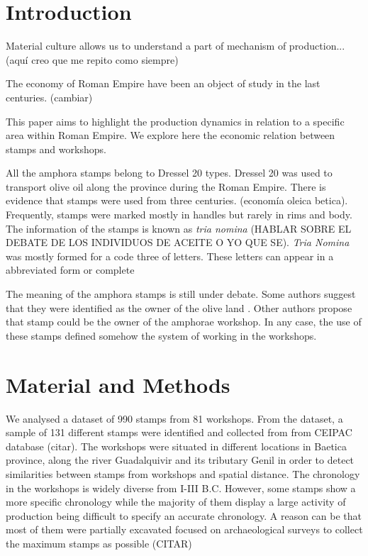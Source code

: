 \documentclass[review]{elsarticle}
\begin{document}
\section{Introduction}


Material culture allows us to understand a part of mechanism of production... (aquí creo que me repito como siempre)


The economy of Roman Empire have been an object of study in the last centuries. (cambiar)

This paper aims to highlight the production dynamics in relation to a specific area within Roman Empire. We explore here the economic relation between stamps and workshops. 





All the amphora stamps belong to Dressel 20 types. Dressel 20 was used to transport olive oil along the province during the Roman Empire. There is evidence that stamps were used from three centuries. (economía oleica betica). Frequently, stamps were marked mostly in handles but rarely in rims and body.  
The information of the stamps is known as \textit{tria nomina} (HABLAR SOBRE EL DEBATE DE LOS INDIVIDUOS DE ACEITE O YO QUE SE). \textit{Tria Nomina} was mostly formed for a code three of letters. These letters can appear in a abbreviated form or complete \citep{berni_millet_amphora_1996}

The meaning of the amphora stamps is still under debate. Some authors suggest that they were identified as the owner of the olive land \citep{rodriguez_economioleicola_1977}. Other authors propose that stamp could be the owner of the amphorae workshop. In any case, the use of these stamps defined somehow the system of working in the workshops. 

\section{Material and Methods}

We analysed a dataset of 990 stamps from 81 workshops. From the dataset, a sample of 131 different stamps were identified and collected from from CEIPAC database (citar). The workshops were situated in different locations in Baetica province, along the river Guadalquivir and its tributary Genil in order to detect similarities between stamps from workshops and spatial distance. The chronology in the workshops is widely diverse from I-III B.C. However, some stamps show a more specific chronology while the majority of them display a large activity of production being difficult to specify an accurate chronology. A reason can be that most of them were partially excavated focused on archaeological surveys to collect the maximum stamps as possible (CITAR) 
\end{document}
